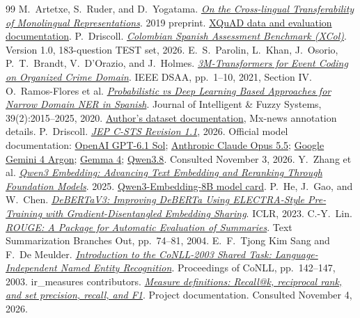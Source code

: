 \documentclass{article}
\begin{document}
\begin{thebibliography}{99}
 M.~Artetxe, S.~Ruder, and D.~Yogatama. \href{https://arxiv.org/abs/1910.11856}{\emph{On the Cross-lingual Transferability of Monolingual Representations}}. 2019 preprint. \href{https://github.com/google-deepmind/xquad}{XQuAD data and evaluation documentation}.
 P.~Driscoll. \href{https://huggingface.co/datasets/pvd232/XCo}{\emph{Colombian Spanish Assessment Benchmark (XCol)}}. Version 1.0, 183-question TEST set, 2026.
 E.~S.~Parolin, L.~Khan, J.~Osorio, P.~T.~Brandt, V.~D'Orazio, and J.~Holmes. \href{https://doi.org/10.1109/DSAA53316.2021.9564232}{\emph{3M-Transformers for Event Coding on Organized Crime Domain}}. IEEE DSAA, pp.~1--10, 2021, Section IV.
 O.~Ramos-Flores et al. \href{https://doi.org/10.3233/JIFS-179868}{\emph{Probabilistic vs Deep Learning Based Approaches for Narrow Domain NER in Spanish}}. Journal of Intelligent \& Fuzzy Systems, 39(2):2015--2025, 2020. \href{https://github.com/orlandxrf/spanish-ner}{Author's dataset documentation}, Mx-news annotation details.
 P.~Driscoll. \href{https://github.com/pvd232/JEP/tree/main/datasets/csts-jep-revision-v1-1}{\emph{JEP C-STS Revision 1.1}}, 2026.
 Official model documentation: \href{https://developers.openai.com/api/docs/models/gpt-6.1-sol}{OpenAI GPT-6.1 Sol}; \href{https://platform.claude.com/docs/en/models/opus-5-5/overview}{Anthropic Claude Opus 5.5}; \href{https://ai.google.dev/gemini-api/docs/models/gemini-4-argon}{Google Gemini 4 Argon}; \href{https://ai.google.dev/gemma/docs/core/model_card_4}{Gemma 4}; \href{https://huggingface.co/Qwen/Qwen3.8-27B}{Qwen3.8}. Consulted November 3, 2026.
 Y.~Zhang et al. \href{https://arxiv.org/abs/2506.05176}{\emph{Qwen3 Embedding: Advancing Text Embedding and Reranking Through Foundation Models}}. 2025. \href{https://huggingface.co/Qwen/Qwen3-Embedding-8B}{Qwen3-Embedding-8B model card}.
 P.~He, J.~Gao, and W.~Chen. \href{https://arxiv.org/abs/2111.09543}{\emph{DeBERTaV3: Improving DeBERTa Using ELECTRA-Style Pre-Training with Gradient-Disentangled Embedding Sharing}}. ICLR, 2023.
 C.-Y.~Lin. \href{https://aclanthology.org/W04-1013/}{\emph{ROUGE: A Package for Automatic Evaluation of Summaries}}. Text Summarization Branches Out, pp.~74--81, 2004.
 E.~F.~Tjong Kim Sang and F.~De Meulder. \href{https://aclanthology.org/W03-0419/}{\emph{Introduction to the CoNLL-2003 Shared Task: Language-Independent Named Entity Recognition}}. Proceedings of CoNLL, pp.~142--147, 2003.
 ir\_measures contributors. \href{https://ir-measur.es/en/latest/measures.html}{\emph{Measure definitions: Recall@k, reciprocal rank, and set precision, recall, and F1}}. Project documentation. Consulted November 4, 2026.

\end{thebibliography}
\end{document}

